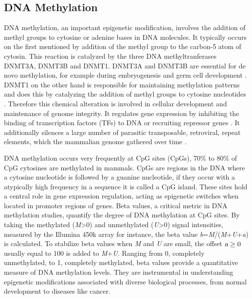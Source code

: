 \documentclass[pdftex,12pt,a4paper]{report}
\begin{document}
\subsection{DNA Methylation}
DNA methylation, an important epigenetic modification, involves the addition of methyl groups to cytosine or adenine bases in DNA molecules. It typically occurs on the first mentioned by addition of the methyl group to the carbon-5 atom of cytosin. This reaction is catalyzed by the three DNA methyltranferases DNMT3A, DNMT3B and DNMT1. DNMT3A and DNMT3B are essential for de novo methylation, for example during embryogenesis and germ cell development \cite{methylation_dnmtsAB}. DNMT1 on the other hand is responsible for maintaining methylation patterns and does this by catalyzing the addition of methyl groups to cytosine nucleotides \cite{methylation_dnmts1}. Therefore this chemical alteration is involved in cellular development and maintenance of genome integrity. It regulates gene expression by inhibiting the binding of transcription factors (TFs) to DNA or recruiting repressor genes \cite{gene_regulation}. It additionally silences a large number of parasitic transposable, retroviral, repeat elements, which the mammalian genome gathered over time \cite{MethRole}.

DNA methylation occurs very frequently at CpG sites (CpGs), 70\% to 80\% of CpG cytosines are methylated in mammals\cite{methylation_cpg}.
CpGs are regions in the DNA where a cytosine nucleotide is followed by a guanine nucleotide, if they occur with a atypically high frequency in a sequence it is called a CpG island\cite{cpgislandguide}.
These sites hold a central role in gene expression regulation, acting as epigenetic switches when located in promoter regions of genes\cite{cpgisland}. 
Beta values, a critical metric in DNA methylation studies, quantify the degree of DNA methylation at CpG sites. By taking the methylated (\emph{M}>0) and unmethylated (\emph{U}>0) signal intensities, measured by the Illumina 450k array for instance, the beta value \emph{b}=\emph{M}/(\emph{M}+\emph{U}+\emph{a}) is calculated. To stabilize beta values when \emph{M} and \emph{U} are small, the offset $\emph{a}\geq0$ usually equal to 100 is added to \emph{M}+\emph{U}. Ranging from 0, completely unmethylated, to 1, completely methylated, beta values provide a quantitative measure of DNA methylation levels. They are instrumental in understanding epigenetic modifications associated with diverse biological processes, from normal development to diseases like cancer\cite{mvalues}.
\end{document}
